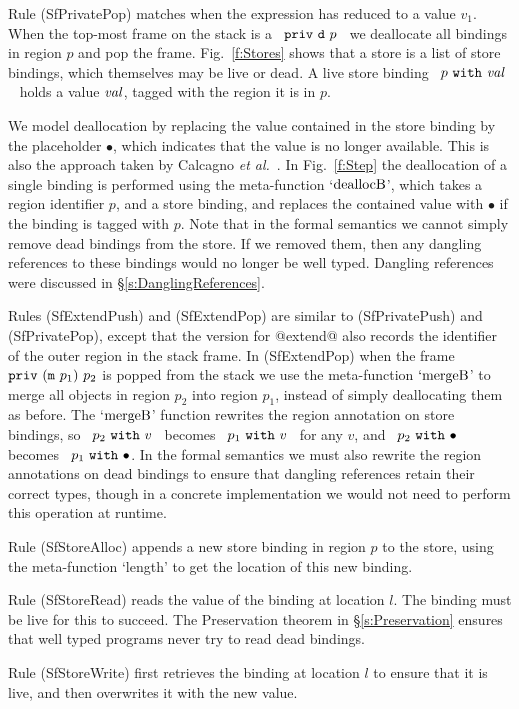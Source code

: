 


Rule (SfPrivatePop) matches when the expression has reduced to a value $v_1$. When the top-most frame on the stack is a ~$\texttt{priv}~ \texttt{d}~ p$~ we deallocate all bindings in region $p$ and pop the frame. Fig.~\ref{f:Stores} shows that a store is a list of store bindings, which themselves may be live or dead. A live store binding ~$p ~\texttt{with}~ \mathit{val}$~ holds a value $\mathit{val}$, tagged with the region it is in $p$. 

We model deallocation by replacing the value contained in the store binding by the placeholder $\bullet$, which indicates that the value is no longer available. This is also the approach taken by Calcagno \emph{et al.}~. In Fig.~\ref{f:Step} the deallocation of a single binding is performed using the meta-function `$\textrm{deallocB}$', which takes a region identifier $p$, and a store binding, and replaces the contained value with $\bullet$ if the binding is tagged with $p$. Note that in the formal semantics we cannot simply remove dead bindings from the store. If we removed them, then any dangling references to these bindings would no longer be well typed. Dangling references were discussed in \S\ref{s:DanglingReferences}.

Rules (SfExtendPush) and (SfExtendPop) are similar to (SfPrivatePush) and (SfPrivatePop), except that the version for @extend@ also records the identifier of the outer region in the stack frame. In (SfExtendPop) when the frame $\texttt{priv}~ (\texttt{m}~ p_1)~ p_2$ is popped from the stack we use the meta-function $`\textrm{mergeB}$' to merge all objects in region $p_2$ into region $p_1$, instead of simply deallocating them as before. The `$\textrm{mergeB}$' function rewrites the region annotation on store bindings, so ~$p_2 ~\texttt{with}~ v$~ becomes ~$p_1 ~\texttt{with}~ v$~ for any $v$, and ~$p_2 ~\texttt{with}~ \bullet$~ becomes ~$p_1 ~\texttt{with}~ \bullet$. In the formal semantics we must also rewrite the region annotations on dead bindings to ensure that dangling references retain their correct types, though in a concrete implementation we would not need to perform this operation at runtime.

Rule (SfStoreAlloc) appends a new store binding in region $p$ to the store, using the meta-function `length' to get the location of this new binding.

Rule (SfStoreRead) reads the value of the binding at location $l$. The binding must be live for this to succeed. The Preservation theorem in \S\ref{s:Preservation} ensures that well typed programs never try to read dead bindings.

Rule (SfStoreWrite) first retrieves the binding at location $l$ to ensure that it is live, and then overwrites it with the new value. 
